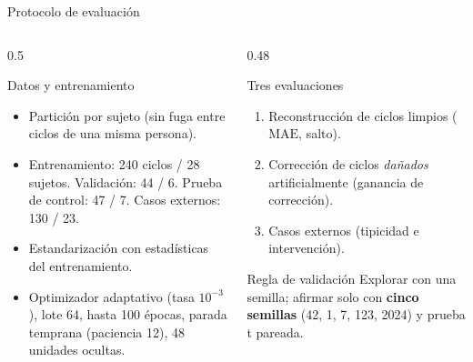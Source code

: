 \documentclass[aspectratio=169,10pt,t]{beamer}
\newcommand{\mae}{\ensuremath{\mathrm{MAE}}}
\begin{document}
\begin{frame}{Protocolo de evaluación}
\begin{columns}[T]
\begin{column}{0.5\textwidth}
\begin{block}{Datos y entrenamiento}
\begin{itemize}\setlength{\itemsep}{2pt}\small
\item Partición \alert{por sujeto} (sin fuga entre ciclos de una misma persona).
\item Entrenamiento: 240 ciclos / 28 sujetos. Validación: 44 / 6. Prueba de control: 47 / 7. Casos externos: 130 / 23.
\item Estandarización con estadísticas del entrenamiento.
\item Optimizador adaptativo (tasa $10^{-3}$), lote 64, hasta 100 épocas, parada temprana (paciencia 12), 48 unidades ocultas.
\end{itemize}
\end{block}
\end{column}
\begin{column}{0.48\textwidth}
\begin{block}{Tres evaluaciones}
\begin{enumerate}\setlength{\itemsep}{2pt}\small
\item[I.] Reconstrucción de ciclos limpios (\mae{}, salto).
\item[II.] Corrección de ciclos \emph{dañados} artificialmente (ganancia de corrección).
\item[III.] Casos externos (tipicidad e intervención).
\end{enumerate}
\end{block}
\begin{exampleblock}{Regla de validación}
Explorar con una semilla; afirmar solo con \textbf{cinco semillas} (42, 1, 7, 123, 2024) y prueba t pareada.
\end{exampleblock}
\end{column}
\end{columns}
\end{frame}
\end{document}
